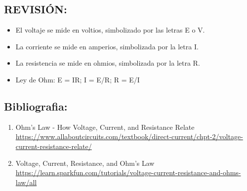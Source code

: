 \documentclass[output=paper, 
colorlinks,
citecolor=brown,
newtxmath
]{langscibook}
\begin{document}
\subsection{REVISIÓN:}

\begin{itemize}
  \setlength\itemsep{-0.5em}
\item El voltaje se mide en voltios, simbolizado por las letras E o V.
\item La corriente se mide en amperios, simbolizada por la letra I.
\item La resistencia se mide en ohmios, simbolizada por la letra R.
\item Ley de Ohm: E = IR; I = E/R; R = E/I
\end{itemize}


\subsection{Bibliografia:}

\begin{enumerate}
  \setlength\itemsep{-0.5em}
\item Ohm’s Law - How Voltage, Current, and Resistance Relate \url{https://www.allaboutcircuits.com/textbook/direct-current/chpt-2/voltage-current-resistance-relate/}
\item Voltage, Current, Resistance, and Ohm's Law \url{https://learn.sparkfun.com/tutorials/voltage-current-resistance-and-ohms-law/all}
\end{enumerate}
\end{document}
